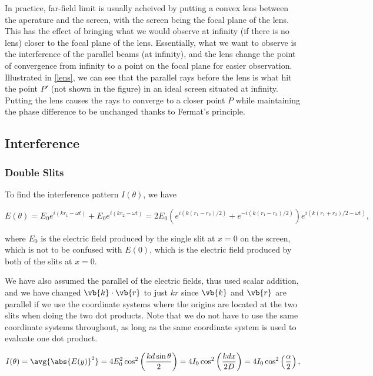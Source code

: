 \documentclass[english,a4paper,12pt]{report}
\begin{document}
In practice, far-field limit is usually acheived by putting a convex lens between the aperature and the screen, with the screen being the focal plane of the lens. This has the effect of bringing what we would observe at infinity (if there is no lens) closer to the focal plane of the lens. Essentially, what we want to observe is the interference of the parallel beams (at infinity), and the lens change the point of convergence from infinity to a point on the focal plane for easier observation. Illustrated in \cref{lens}, we can see that the parallel rays before the lens is what hit the point \(P'\) (not shown in the figure) in an ideal screen situated at infinity. Putting the lens causes the rays to converge to a closer point \(P\) while maintaining the phase difference to be unchanged thanks to Fermat's principle.


\subsection{Interference}

\subsubsection{Double Slits}

To find the interference pattern \(I(\theta )\), we have

\begin{equation}
    E(\theta ) = E_0 e^{i(kr_1 - \omega t)} + E_0 e^{i(kr_2 - \omega t)} = 2E_0 \left( e^{i(k(r_1 -r_2 )/2)} + e^{-i(k(r_1 -r_2 )/2)}    \right) e^{i (k(r_1 +r_2 ) /2- \omega t)},   
\end{equation}

where \(E_0 \) is the electric field produced by the single slit at \(x=0\) on the screen, which is not to be confused with \(E(0)\), which is the electric field produced by both of the slits at \(x = 0\).

We have also assumed the parallel of the electric fields, thus used scalar addition, and we have changed \(\vb{k} \cdot \vb{r} \) to just \(kr\) since \(\vb{k} \) and \(\vb{r} \) are parallel if we use the coordinate systems where the origins are located at the two slits when doing the two dot products. Note that we do not have to use the same coordinate systems throughout, as long as the same coordinate system is used to evaluate one dot product.

\begin{equation}
    I(\theta ) = \avg{\abs{E(y)}^2 } = 4 E_0 ^2\cos ^2\left( \frac{kd \sin \theta }{2}  \right) = 4I_0 \cos ^2\left( \frac{kdx}{2D}  \right) = 4I_0 \cos ^2\left( \frac{\alpha }{2}  \right),
\end{equation}
\end{document}

